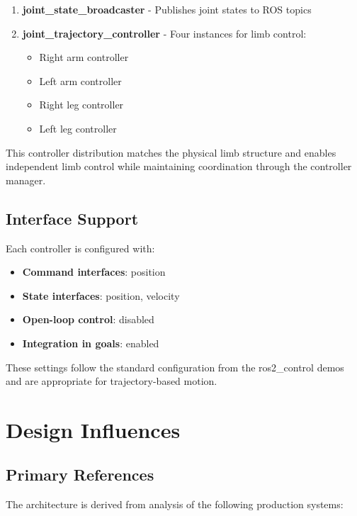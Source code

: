 \documentclass[12pt,a4paper]{article}
\begin{document}
\begin{enumerate}
    \item \textbf{joint\_state\_broadcaster} - Publishes joint states to ROS topics
    \item \textbf{joint\_trajectory\_controller} - Four instances for limb control:
    \begin{itemize}
        \item Right arm controller
        \item Left arm controller  
        \item Right leg controller
        \item Left leg controller
    \end{itemize}
\end{enumerate}

This controller distribution matches the physical limb structure and enables 
independent limb control while maintaining coordination through the controller 
manager.

\subsection{Interface Support}
Each controller is configured with:

\begin{itemize}
    \item \textbf{Command interfaces}: position
    \item \textbf{State interfaces}: position, velocity
    \item \textbf{Open-loop control}: disabled
    \item \textbf{Integration in goals}: enabled
\end{itemize}

These settings follow the standard configuration from the ros2\_control demos 
and are appropriate for trajectory-based motion.

\section{Design Influences}

\subsection{Primary References}
The architecture is derived from analysis of the following production systems:
\end{document}
